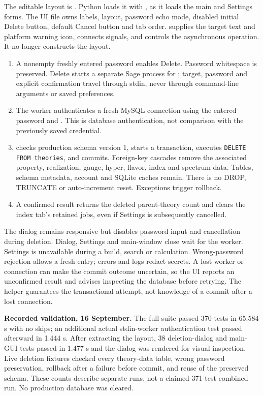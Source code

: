 The editable layout is . Python loads it
with , as it loads the main and Settings forms. The UI file
owns labels, layout, password echo mode, disabled initial Delete button,
default Cancel button and tab order. 
supplies the target text and platform warning icon, connects signals, and
controls the asynchronous operation. It no longer constructs the layout.

\begin{enumerate}
\item A nonempty freshly entered password enables Delete. Password whitespace
is preserved. Delete starts a separate Sage process for
; target, password and explicit confirmation travel
through stdin, never through command-line arguments or saved preferences.
\item The worker authenticates a fresh MySQL connection using the entered
password and . This is database authentication,
not comparison with the previously saved credential.
\item {} checks production schema version 1, starts a transaction,
executes \texttt{DELETE FROM theories}, and commits. Foreign-key cascades remove
the associated property, realization, gauge, hyper, flavor, index and spectrum
data. Tables, schema metadata, account and SQLite caches remain. There is no
DROP, TRUNCATE or auto-increment reset. Exceptions trigger rollback.
\item A confirmed result returns the deleted parent-theory count and clears
the index tab's retained jobs, even if Settings is subsequently cancelled.
\end{enumerate}

The dialog remains responsive but disables password input and cancellation
during deletion. Dialog, Settings and main-window close wait for the worker.
Settings is unavailable during a build, search or calculation. Wrong-password
rejection allows a fresh entry; errors and logs redact secrets. A lost worker
or connection can make the commit outcome uncertain, so the UI reports an
unconfirmed result and advises inspecting the database before retrying.
The helper guarantees the transactional attempt, not knowledge of a commit
after a lost connection.

\textbf{Recorded validation, 16 September.} The full suite passed 370 tests in
65.584 s with no skips; an additional actual stdin-worker authentication test
passed afterward in 1.444 s. After extracting the layout, 38 deletion-dialog
and main-GUI tests passed in 1.477 s and the dialog was rendered for visual
inspection. Live deletion fixtures checked every theory-data table, wrong
password preservation, rollback after a failure before commit, and reuse of
the preserved schema. These counts describe separate runs, not a claimed
371-test combined run. No production database was cleared.
